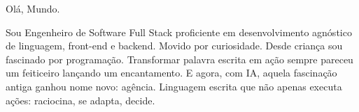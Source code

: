 %
%
%
\par{
Olá, Mundo.

Sou Engenheiro de Software Full Stack proficiente em desenvolvimento agnóstico de linguagem, front-end e backend. Movido por curiosidade. Desde criança sou fascinado por programação. Transformar palavra escrita em ação sempre pareceu um feiticeiro lançando um encantamento. E agora, com IA, aquela fascinação antiga ganhou nome novo: agência. Linguagem escrita que não apenas executa ações: raciocina, se adapta, decide.
}